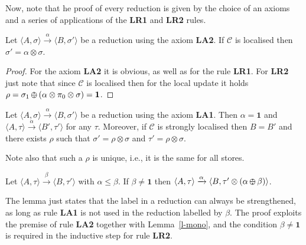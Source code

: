 \documentclass{llncs}
\def\1{{\mathbf 1}}
\def\C{{\mathcal C}}
\def\monid{{\mathbf 0}}
\def\1{{\mathbf 1}}
\def\C{{\mathcal C}}
\def\odiv{\, {\ominus\hspace{-7.7pt} \div} \,}
\def\monid{\mathbf{1}}
\begin{document}
Now, note that he proof of every reduction is given by the choice of an axioms and a series of applications of
the {\bf LR1} and  {\bf LR2} rules.

\begin{lemma}
\label{LA2}
Let $\langle A, \sigma \rangle \xrightarrow{\alpha} \langle B, \sigma' \rangle$ be a reduction 
using the axiom {\bf LA2}. If $\C$ is localised then $\sigma' = \alpha \otimes \sigma$.
%
\end{lemma}
\begin{proof}
For the axiom {\bf LA2} it is obvious, as well as for the rule {\bf LR1}.
For {\bf LR2} just note that
since $\C$ is localised then for the local update 
it holds $\rho = \sigma_1 \odiv (\alpha \otimes \pi_0 \otimes \sigma) = \1$.
\end{proof}

\begin{lemma}
\label{LA1}
Let $\langle A, \sigma \rangle \xrightarrow{\alpha} \langle B, \sigma' \rangle$ be a reduction 
using the axiom {\bf LA1}. Then $\alpha = \1$ and 
$\langle A, \tau \rangle \xrightarrow{\alpha} \langle B', \tau' \rangle$
for any $\tau$.
Moreover, if $\C$ is strongly localised then $B = B'$ and there exists 
$\rho$ such that $\sigma' = \rho \otimes \sigma$
and $\tau' = \rho \otimes \sigma$.
\end{lemma}

Note also that such a $\rho$ is unique, i.e., it is the same for all stores.


\begin{lemma}
\label{riminor}
Let $\langle A, \tau \rangle \xrightarrow{\beta} \langle B, \tau' \rangle$ with $\alpha \leq \beta$. 
%
If $\beta \neq \monid$ then $\langle A, \tau \rangle \xrightarrow{\alpha} \langle B, \tau' \otimes (\alpha \odiv \beta) \rangle$.
%
\end{lemma}

The lemma just states that the label in a reduction can always be strengthened,
as long as rule  {\bf LA1} is not used in the reduction labelled by $\beta$.
The proof exploits the premise of rule {\bf LA2} together with Lemma~\ref{l-mono},
and the condition $\beta \neq \monid$ is required in the inductive step for rule  {\bf LR2}.
\end{document}

